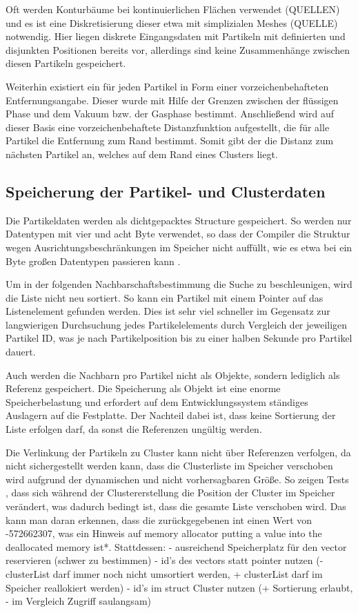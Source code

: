 Oft werden Konturbäume bei kontinuierlichen Flächen verwendet (QUELLEN) und es ist eine Diskretisierung dieser etwa mit simplizialen Meshes (QUELLE) notwendig. Hier liegen diskrete Eingangsdaten mit Partikeln mit definierten und disjunkten Positionen bereits vor, allerdings sind keine Zusammenhänge zwischen diesen Partikeln gespeichert.

Weiterhin existiert ein  für jeden Partikel in Form einer vorzeichenbehafteten Entfernungsangabe. Dieser wurde mit Hilfe der Grenzen zwischen der flüssigen Phase und dem Vakuum bzw. der Gasphase bestimmt. Anschließend wird auf dieser Basis eine vorzeichenbehaftete Distanzfunktion aufgestellt, die für alle Partikel die Entfernung zum Rand bestimmt. Somit gibt der  die Distanz zum nächsten Partikel an, welches auf dem Rand eines Clusters liegt.

\subsection{Speicherung der Partikel- und Clusterdaten}

Die Partikeldaten werden als dichtgepacktes Structure gespeichert. So werden nur Datentypen mit vier und acht Byte verwendet, so dass der Compiler die Struktur wegen Ausrichtungsbeschränkungen im Speicher nicht auffüllt, wie es etwa bei ein Byte großen Datentypen passieren kann \cite{raymond1994cAlignment}.

Um in der folgenden Nachbarschaftsbestimmung die Suche zu beschleunigen, wird die Liste nicht neu sortiert. So kann ein Partikel mit einem Pointer auf das Listenelement gefunden werden. Dies ist sehr viel schneller im Gegensatz zur langwierigen Durchsuchung jedes Partikelelements durch Vergleich der jeweiligen Partikel ID, was je nach Partikelposition bis zu einer halben Sekunde pro Partikel dauert.

Auch werden die Nachbarn pro Partikel nicht als Objekte, sondern lediglich als Referenz gespeichert. Die Speicherung als Objekt ist eine enorme Speicherbelastung und erfordert auf dem Entwicklungssystem ständiges Auslagern auf die Festplatte. Der Nachteil dabei ist, dass keine Sortierung der Liste erfolgen darf, da sonst die Referenzen ungültig werden.

Die Verlinkung der Partikeln zu Cluster kann nicht über Referenzen verfolgen, da nicht sichergestellt werden kann, dass die Clusterliste im Speicher verschoben wird aufgrund der dynamischen und nicht vorhersagbaren Größe. So zeigen Tests %
, dass sich während der Clustererstellung die Position der Cluster im Speicher verändert, was dadurch bedingt ist, dass die gesamte Liste verschoben wird. Das kann man daran erkennen, dass die zurückgegebenen int einen Wert von -572662307, was ein Hinweis auf memory allocator putting a value into the deallocated memory ist*. Stattdessen:
- ausreichend Speicherplatz für den vector reservieren (schwer zu bestimmen)
- id's des vectors statt pointer nutzen (- clusterList darf immer noch nicht umsortiert werden, + clusterList darf im Speicher reallokiert werden)
- id's im struct Cluster nutzen (+ Sortierung erlaubt, - im Vergleich Zugriff saulangsam)


